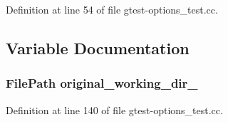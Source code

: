 \-Definition at line 54 of file gtest-\/options\-\_\-test.\-cc.



\subsection{\-Variable \-Documentation}
\hypertarget{gtest-options__test_8cc_aa5f13fd18a275d0a3117700f30bfb9ff}{
\subsubsection[{original\-\_\-working\-\_\-dir\-\_\-}]{\setlength{\rightskip}{0pt plus 5cm}\-File\-Path {\bf original\-\_\-working\-\_\-dir\-\_\-}}}\label{dd/d90/gtest-options__test_8cc_aa5f13fd18a275d0a3117700f30bfb9ff}


\-Definition at line 140 of file gtest-\/options\-\_\-test.\-cc.

